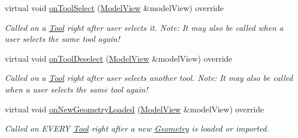 \begin{DoxyCompactItemize}
virtual void \mbox{\hyperlink{classpepr3d_1_1_export_assistant_acb764e7f07b64884c024f079e3936037}{on\+Tool\+Select}} (\mbox{\hyperlink{classpepr3d_1_1_model_view}{Model\+View}} \&model\+View) override
\begin{DoxyCompactList}\small\item\em Called on a \mbox{\hyperlink{classpepr3d_1_1_tool}{Tool}} right after user selects it. Note\+: It may also be called when a user selects the same tool again! \end{DoxyCompactList}\item 
\mbox{\label{classpepr3d_1_1_export_assistant_ae1942fa90724a66bf6bc9e0d8b521667}} 
virtual void \mbox{\hyperlink{classpepr3d_1_1_export_assistant_ae1942fa90724a66bf6bc9e0d8b521667}{on\+Tool\+Deselect}} (\mbox{\hyperlink{classpepr3d_1_1_model_view}{Model\+View}} \&model\+View) override
\begin{DoxyCompactList}\small\item\em Called on a \mbox{\hyperlink{classpepr3d_1_1_tool}{Tool}} right after user selects another tool. Note\+: It may also be called when a user selects the same tool again! \end{DoxyCompactList}\item 
\mbox{\label{classpepr3d_1_1_export_assistant_af1d731fa49180aea45b8097b47f4c21e}} 
virtual void \mbox{\hyperlink{classpepr3d_1_1_export_assistant_af1d731fa49180aea45b8097b47f4c21e}{on\+New\+Geometry\+Loaded}} (\mbox{\hyperlink{classpepr3d_1_1_model_view}{Model\+View}} \&model\+View) override
\begin{DoxyCompactList}\small\item\em Called on E\+V\+E\+RY \mbox{\hyperlink{classpepr3d_1_1_tool}{Tool}} right after a new \mbox{\hyperlink{classpepr3d_1_1_geometry}{Geometry}} is loaded or imported. \end{DoxyCompactList}\end{DoxyCompactItemize}
